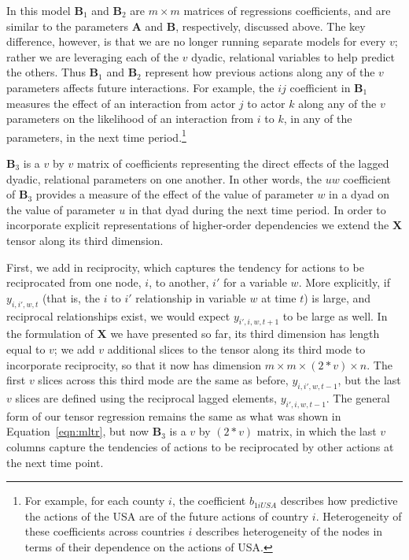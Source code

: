 \documentclass[3p,times,twocolumn,authoryear,12pt]{elsarticle}
\newcommand{\bl}[1]{{\mathbf #1}}
\begin{document}
In this model $\bl B_{1}$ and $\bl B_{2}$ are $m \times m$ matrices of regressions coefficients, and are similar to the parameters $\bl A$ and $\bl B$, respectively, discussed above. The key difference, however, is that we are no longer running separate models for every $v$; rather we are leveraging each of the $v$ dyadic, relational variables to help predict the others. Thus $\bl B_{1}$ and $\bl B_{2}$ represent how previous actions along any of the $v$ parameters affects future interactions. For example, the $i j$ coefficient in $\bl B_{1}$ measures the effect of an interaction from actor $j$ to actor $k$ along any of the $v$ parameters on the likelihood of an interaction from $i$ to $k$, in any of the parameters, in the next time period.\footnote{For example, for each county $i$, the coefficient $b_{1iUSA}$ describes how predictive the actions of the USA are of the future actions of country $i$. Heterogeneity of these coefficients across countries $i$ describes heterogeneity of the nodes in terms of their dependence on the actions of USA.}

$\bl B_3$ is a $v$ by $v$ matrix of coefficients representing the direct effects of the lagged dyadic, relational parameters on one another. In other words, the $u w$ coefficient of $\bl B_3$ provides a measure of the effect of the value of parameter $w$ in a dyad on the value of parameter $u$ in that dyad during the next time period. In order to incorporate explicit representations of higher-order dependencies we extend the $\bl X$ tensor along its third dimension. 

First, we add in reciprocity, which captures the tendency for actions to be reciprocated from one node, $i$, to another, $i'$ for a variable $w$. More explicitly, if $y_{i,i',w,t}$ (that is, the $i$ to $i'$ relationship in variable $w$ at time $t$) is large, and reciprocal relationships exist, we would expect $y_{i',i,w,t+1}$ to be large as well. In the formulation of $\bl X$ we have presented so far, its third dimension has length equal to $v$; we add $v$ additional slices to the tensor along its third mode to incorporate reciprocity, so that it now has dimension $m \times m \times (2*v) \times n$. The first $v$ slices across this third mode are the same as before, $y_{i,i',w,t-1}$, but the last $v$ slices are defined using the reciprocal lagged elements, $y_{i',i,w,t-1}$. The general form of our tensor regression remains the same as what was shown in Equation~\ref{eqn:mltr}, but now $\bl B_3$ is a $v$ by $(2*v)$ matrix, in which the last $v$ columns capture the tendencies of actions to be reciprocated by other actions at the next time point.
\end{document}
